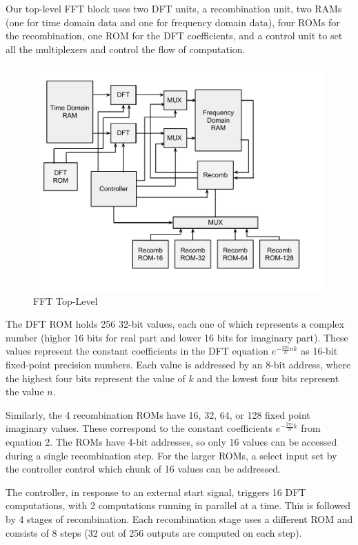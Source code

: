 \documentclass{article}
\begin{document}
	Our top-level FFT block uses two DFT units, a recombination unit,
	two RAMs (one for time domain data and one for frequency domain data),
	four ROMs for the recombination, one ROM for the DFT coefficients, and
	a control unit to set all the multiplexers and control the flow of
	computation.

	\begin{figure}[H]
		\centering
		\includegraphics[scale=0.3]{fft-top}
		\caption{FFT Top-Level}
	\end{figure}

	The DFT ROM holds 256 32-bit values, each one of which represents a
	complex number (higher 16 bits for real part and lower 16 bits for
	imaginary part). These values represent the constant coefficients
	in the DFT equation \(e^{-\frac{2\pi i}{N} n k}\) as 16-bit fixed-point
	precision numbers. Each value is addressed by an 8-bit address, where
	the highest four bits represent the value of \(k\) and the lowest four bits
	represent the value \(n\).

	Similarly, the 4 recombination ROMs have 16, 32, 64, or 128 fixed point
	imaginary values. These correspond to the constant coefficients
	\(e^{-\frac{2\pi i}{N}k}\) from equation 2. The ROMs have 4-bit addresses, 
	so only 16 values can be accessed during a single recombination step. 
	For the larger ROMs, a select input set by the controller control which 
	chunk of 16 values can be addressed.

	The controller, in response to an external start signal, triggers
	16 DFT computations, with 2 computations running in parallel at a time.
	This is followed by 4 stages of recombination. Each recombination stage
	uses a different ROM and consists of 8 steps (32 out of 256 outputs are
	computed on each step).
	
\end{document}
